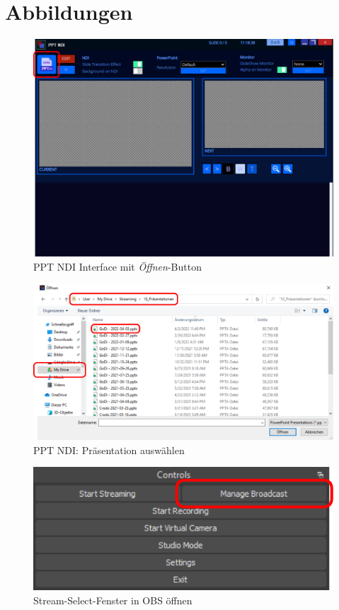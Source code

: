 \chapter{Abbildungen}

\begin{figure}[H]
	\includegraphics[width=\textwidth]{figures/ppt-ndi}

	\caption{PPT NDI Interface mit \textit{Öffnen}-Button}
	\label{fig:ppt-ndi:interface}
\end{figure}

\begin{figure}[H]
	\includegraphics[width=\textwidth]{figures/ppt-ndi-open-dialog}

	\caption{PPT NDI: Präsentation auswählen}
	\label{fig:ppt-ndi:open-dialog}
\end{figure}

\begin{figure}[H]
	\centering
	\includegraphics[width=\textwidth]{figures/obs-interface-stream-select}

	\caption{Stream-Select-Fenster in OBS öffnen}
	\label{fig:obs:interface:stream-select}
\end{figure}

